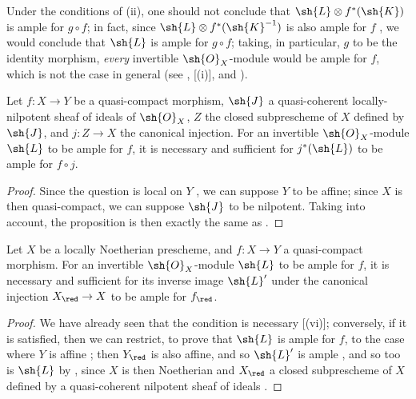 \begin{remark}[4.6.14]
\label{II.4.6.14}
Under the conditions of (ii), one should not conclude that $\sh{L}\otimes f^*(\sh{K})$ is ample for $g\circ f$;
in fact, since $\sh{L}\otimes f^*(\sh{K}^{-1})$ is also ample for $f$ , we would conclude that $\sh{L}$ is ample for $g\circ f$;
taking, in particular, $g$ to be the identity morphism, \emph{every} invertible $\sh{O}_X$-module would be ample for $f$, which is not the case in general (see , [(i)], and ).
\end{remark}

\begin{proposition}[4.6.15]
\label{II.4.6.15}
Let $f:X\to Y$ be a quasi-compact morphism, $\sh{J}$ a quasi-coherent locally-nilpotent sheaf of ideals of $\sh{O}_X$, $Z$ the closed subprescheme of $X$ defined by $\sh{J}$, and $j:Z\to X$ the canonical injection.
For an invertible $\sh{O}_X$-module $\sh{L}$ to be ample for $f$, it is necessary and sufficient for $j^*(\sh{L})$ to be ample for $f\circ j$.
\end{proposition}

\begin{proof}
Since the question is local on $Y$ , we can suppose $Y$ to be affine;
since $X$ is then quasi-compact, we can suppose $\sh{J}$ to be nilpotent.
Taking  into account, the proposition is then exactly the same as .
\end{proof}

\begin{corollary}[4.6.16]
\label{II.4.6.16}
Let $X$ be a locally Noetherian prescheme, and $f:X\to Y$ a quasi-compact morphism.
For an invertible $\sh{O}_X$-module $\sh{L}$ to be ample for $f$, it is necessary and sufficient for its inverse image $\sh{L}'$ under the canonical injection $X_\red\to X$ to be ample for $f_\red$.
\end{corollary}

\begin{proof}
We have already seen that the condition is necessary [(vi)];
conversely, if it is satisfied, then we can restrict, to prove that $\sh{L}$ is ample for $f$, to the case where $Y$ is affine ;
then $Y_\red$ is also affine, and so $\sh{L}'$ is ample , and so too is $\sh{L}$ by , since $X$ is then Noetherian and $X_\red$ a closed subprescheme of $X$ defined by a quasi-coherent nilpotent sheaf of ideals .
\end{proof}

